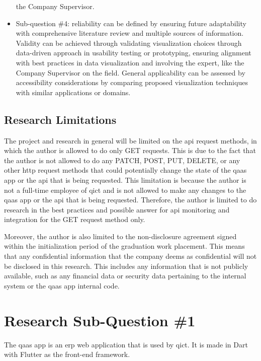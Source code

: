 \begin{multicols}{2}
\begin{itemize}[label=-]
                  the Company Supervisor.
            \item Sub-question \#4: reliability can be defined by ensuring future adaptability with comprehensive
                  literature review and multiple sources of information. Validity can be achieved through validating
                  visualization choices through data-driven approach in usability testing or  prototyping, ensuring
                  alignment with best practices in data visualization and involving the expert, like the Company
                  Supervisor on the field. General applicability can be assessed by accessibility considerations by
                  comparing proposed visualization techniques with similar applications or domains.
      \end{itemize}
      \subsection{Research Limitations}
      The project and research in general will be limited on the \acrshort{api} request methods, in which the author
      is allowed to do only GET requests. This is due to the fact that the author is not allowed to do any PATCH,
      POST, PUT, DELETE, or any other \acrshort{http} request methods that could potentially change the state of the
      \acrshort{qaas} app or the \acrshort{api} that is being requested. This limitation is because the author is not a
      full-time employee of \acrshort{qict} and is not allowed to make any changes to the \acrshort{qaas} app or the
      \acrshort{api} that is being requested. Therefore, the author is limited to do research in the best practices
      and possible answer for \acrshort{api} monitoring and integration for the GET request method only.

      Moreover, the author is also limited to the non-disclosure agreement signed within the initialization period of
      the graduation work placement. This means that any confidential information that the company deems as confidential
      will not be disclosed in this research. This includes any information that is not publicly available, such as any
      financial data or security data pertaining to the internal system or the \acrshort{qaas} app internal code.
      \section{Research Sub-Question \#1}
      The \acrshort{qaas} app is an \acrshort{erp} web application that is used by \acrshort{qict}. It is made in Dart 
      with Flutter as the front-end framework.


\end{multicols}
